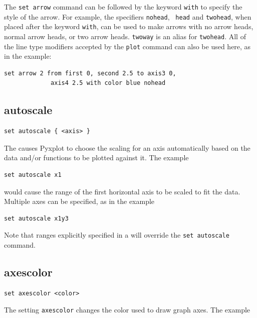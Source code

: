 The {\tt set arrow} command can be followed by the keyword {\tt with} to
specify the style of the arrow. For example, the specifiers {\tt nohead}, {\tt
head} and {\tt twohead}, when placed after the keyword {\tt with}, can be used
to make arrows with no arrow heads, normal arrow heads, or two arrow heads.
{\tt twoway} is an alias for {\tt twohead}. All of the line type modifiers
accepted by the {\tt plot} command can also be used here, as in the example:

\begin{verbatim}
set arrow 2 from first 0, second 2.5 to axis3 0,
             axis4 2.5 with color blue nohead
\end{verbatim}


\subsection{autoscale}

\begin{verbatim}
set autoscale { <axis> }
\end{verbatim}

The  causes Pyxplot to choose the scaling for an axis
automatically based on the data and/or functions to be plotted against it. The
example

\begin{verbatim}
set autoscale x1
\end{verbatim}

\noindent would cause the range of the first horizontal axis to be scaled to
fit the data.  Multiple axes can be specified, as in the example

\begin{verbatim}
set autoscale x1y3
\end{verbatim}

\noindent Note that ranges explicitly specified in a  will
override the {\tt set autoscale} command.


\subsection{axescolor}

\begin{verbatim}
set axescolor <color>
\end{verbatim}

The setting {\tt axescolor} changes the color used to draw graph axes.  The example

